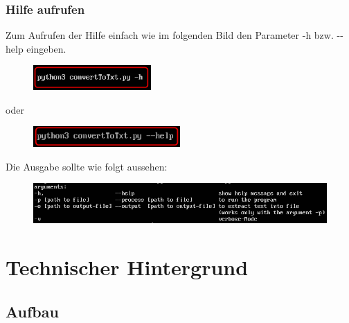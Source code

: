 \documentclass[12pt]{scrartcl}
\begin{document}
\subsubsection{Hilfe aufrufen}
\label{sec:first-steps-help}
Zum Aufrufen der Hilfe einfach wie im folgenden Bild den Parameter -h bzw. -{}-help eingeben.
\newline
\begin{figure}[htbp]
\centering
\includegraphics[width=0.4\textwidth]{ersteSchritteHilfe1}\par\vspace{0.25cm}
\label{fig:ersteSchritteHilfe1}
\end{figure}
\begin{center}
oder
\end{center}
\begin{figure}[htbp]
\centering
\includegraphics[width=0.5\textwidth]{ersteSchritteHilfe2}\par\vspace{0.25cm}
\label{fig:ersteSchritte2}
\end{figure}
Die Ausgabe sollte wie folgt aussehen:
\begin{figure}[htbp]
\centering
\includegraphics[width=1.1\textwidth]{ersteSchritteHilfe3}\par\vspace{0.5cm}
\label{fig:ersteSchritteHilfe3}
\end{figure}
\newpage
\section{Technischer Hintergrund}
\label{sec:technical-background}
\subsection{Aufbau}
\label{sec:technical-background-aufbau}
\end{document}
